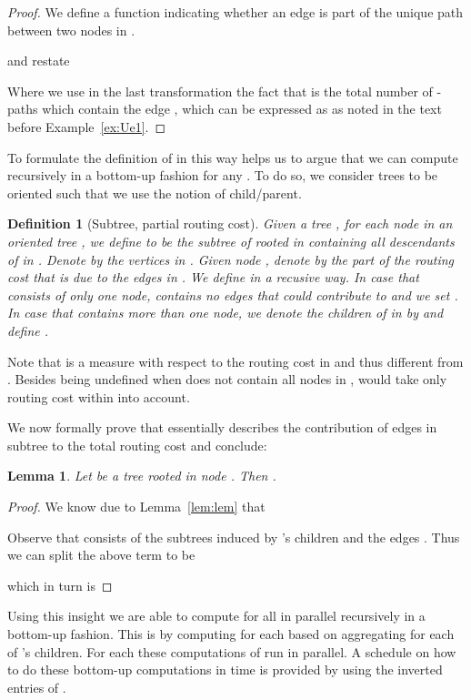 \documentclass[11pt]{article}
\newtheorem{lemma}[theorem]{Lemma}
\newtheorem{definition}[theorem]{Definition}
\begin{document}
\begin{proof}
We define a function  indicating whether an edge is part of the unique path between two nodes in . 

and restate


Where we use in the last transformation the fact that  is the total number of -paths which contain the edge , which can be expressed as  as noted in the text before Example~\ref{ex:Ue1}. 
\end{proof}




To formulate the definition of  in this way helps us to argue that we can compute  recursively in a bottom-up fashion for any . To do so, we consider trees to be oriented such that we use the notion of child/parent. 

\begin{definition}[Subtree, partial routing cost]
Given a tree , for each node  in an oriented tree , we define  to be the subtree of  rooted in  containing all descendants of  in . Denote by  the vertices in . Given node , denote by  the part of the routing cost  that is due to the edges in . We define  in a recusive way. In case that  consists of only one node,  contains no edges that could contribute to  and we set . In case that  contains more than one node, we denote the children of  in  by  and define .
\end{definition}

Note that  is a measure with respect to the routing cost in  and thus different from . Besides  being undefined when  does not contain all nodes in ,  would take only routing cost within  into account.

We now formally prove that  essentially describes the contribution of edges in subtree  to the total routing cost and conclude:
\begin{lemma}\label{lem:part-rc}
Let  be a tree rooted in node . Then .
\end{lemma}
\begin{proof} We know due to Lemma~\ref{lem:lem} that 

Observe that  consists of the subtrees  induced by 's children and the edges  . Thus we can split the above term to be 

which in turn is

\end{proof} 


Using this insight we are able to compute  for all  in parallel recursively in a bottom-up fashion. This is by computing  for each  based on aggregating  for each of 's children. For each  these computations of  run in parallel. A schedule on how to do these bottom-up computations in time  is provided by using the inverted entries of . 
\end{document}

